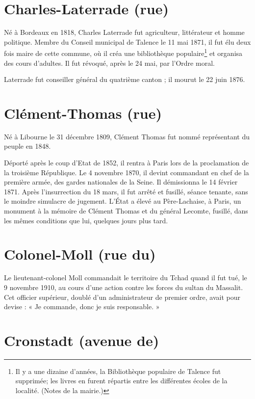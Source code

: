 \documentclass[a4paper,11pt]{book}
\begin{document}
\section{Charles-Laterrade (rue)}

Né à Bordeaux en 1818, Charles Laterrade fut agriculteur, littérateur et homme politique. Membre du Conseil municipal de Talence le 11 mai 1871, il fut élu deux fois maire de cette commune, où il créa une bibliothèque populaire\footnote{Il y a une dizaine d'années, la Bibliothèque populaire de Talence fut supprimée; les livres en furent répartis entre les différentes écoles de la localité. (Notes de la mairie.)} et organisa des cours d'adultes. Il fut révoqué, après le 24 mai, par l'Ordre moral.

Laterrade fut conseiller général du quatrième canton ; il mourut le 22 juin 1876.

\section{Clément-Thomas (rue)}

Né à Libourne le 31 décembre 1809, Clément Thomas fut nommé représentant du peuple en 1848.

Déporté après le coup d'Etat de 1852, il rentra à Paris lors de la proclamation de la troisième République. Le 4 novembre 1870, il devint commandant en chef de la première armée, des gardes nationales de la Seine. Il démissionna le 14 février 1871. Après l'insurrection du 18 mars, il fut arrêté et fusillé, séance tenante, sans le moindre simulacre de jugement. L'État a élevé au Père-Lachaise, à Paris, un monument à la mémoire de Clément Thomas et du général Lecomte, fusillé, dans les mêmes conditions que
lui, quelques jours plus tard.

\section{Colonel-Moll (rue du)}

Le lieutenant-colonel Moll commandait le territoire du Tchad quand il fut tué, le 9 novembre 1910, au cours d'une action contre les forces du sultan du Massalit. Cet officier supérieur, doublé d'un administrateur de premier ordre, avait pour devise : « Je commande, donc je suis responsable. »

\section{Cronstadt (avenue de)}
\end{document}
